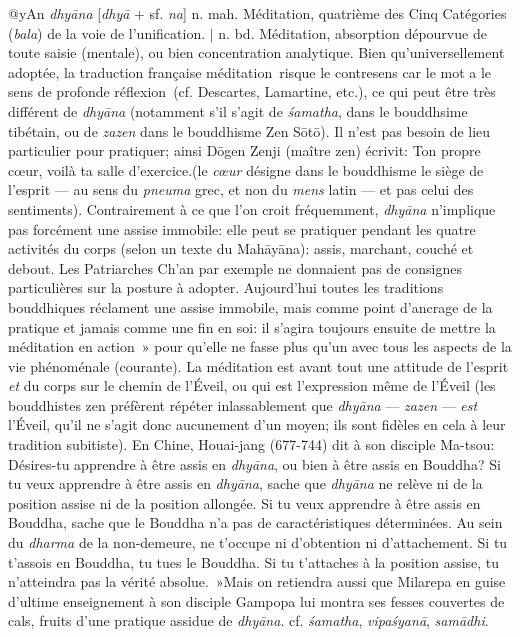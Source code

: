 \documentclass[a4paper,11pt,twocolumn]{article}
\begin{document}
{\dn @yAn} {\em dhy\={a}na} [{\em dhy\={a}} + sf. {\em na}]
n. mah. \og Méditation\fg, quatrième des Cinq Catégories ({\em bala}) de
la voie de l'unification. $\mid$
n. bd. Méditation, absorption
dépourvue de toute saisie (mentale), ou bien concentration
analytique. Bien qu'universellement adoptée, la traduction
fran\c{c}aise \og méditation\fg\
risque le contresens car le mot a le sens de \og profonde réflexion\fg\
(cf. Descartes, Lamartine, etc.), ce qui peut être très différent de
{\em dhy\={a}na} (notamment s'il s'agit de {\em \'{s}amatha}, dans le
bouddhsime tibétain, ou de {\em zazen} dans le bouddhisme
Zen S\={o}t\={o}). Il n'est pas besoin de lieu particulier pour
pratiquer; ainsi D\={o}gen Zenji (maître zen) écrivit: \og Ton propre
c{\oe}ur, voilà ta salle d'exercice.\fg (le {\em c{\oe}ur} désigne
dans le bouddhisme le siège de l'esprit --- au sens du {\em pneuma}
grec, et non du {\em mens} latin --- et pas celui des
sentiments). Contrairement à ce que l'on croit fréquemment, {\em
dhy\={a}na} n'implique pas forcément une  assise immobile: elle peut
se  pratiquer pendant les quatre activités du corps (selon un texte du
Mah\={a}y\={a}na): assis, marchant,  couché et debout. Les Patriarches
Ch'an par exemple ne donnaient pas de consignes particulières sur la
posture à adopter.
Aujourd'hui toutes les traditions bouddhiques réclament une assise
immobile, mais comme point d'ancrage de la pratique et jamais comme
une fin en soi: il s'agira toujours ensuite de \og mettre la
méditation en action~» pour qu'elle ne fasse plus qu'un avec tous
les aspects de la vie phénoménale (courante). La méditation est avant
tout une attitude de l'esprit {\em et} du corps sur le chemin de
l'Éveil, ou qui est l'expression même de l'Éveil (les bouddhistes zen
préfèrent répéter inlassablement que {\em dhy\={a}na} ---  {\em zazen}
--- {\em est}
l'Éveil, qu'il ne s'agit donc aucunement d'un moyen; ils sont fidèles
en cela à leur tradition subitiste). En Chine, Houai-jang (677-744)
dit à son disciple Ma-tsou: \og Désires-tu apprendre à être assis en
{\em dhy\={a}na}, ou bien à être assis en Bouddha? Si tu veux apprendre
à être assis en {\em dhy\={a}na}, sache que {\em dhy\={a}na} ne relève
ni de la position assise ni de la position allongée. Si tu veux
apprendre à être assis en Bouddha, sache que le Bouddha n'a pas de
caractéristiques déterminées. Au sein du {\em dharma} de la
non-demeure, ne t'occupe ni d'obtention ni d'attachement. Si tu
t'assois en Bouddha, tu tues le Bouddha. Si tu t'attaches à la
position assise, tu n'atteindra pas la vérité absolue.~»Mais on
retiendra aussi que Milarepa en guise d'ultime enseignement à son
disciple Gampopa lui montra ses fesses couvertes de cals, fruits d'une
pratique assidue de {\em dhy\={a}na}. cf. {\em \'{s}amatha}, {\em
vipa\'{s}yan\={a}}, {\em sam\={a}dhi}. \\
\end{document}
